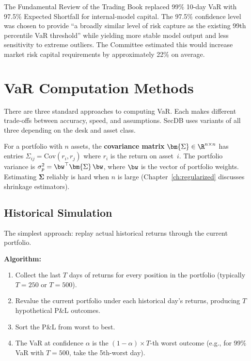 \begin{keyresult}
The Fundamental Review of the Trading Book replaced 99\% 10-day VaR
with 97.5\% Expected Shortfall for internal-model capital.  The 97.5\%
confidence level was chosen to provide ``a broadly similar level of risk
capture as the existing 99th percentile VaR threshold'' while yielding
more stable model output and less sensitivity to extreme outliers.
The Committee estimated this would increase market risk capital
requirements by approximately 22\% on average.
\end{keyresult}


\section{VaR Computation Methods}
\label{sec:var-methods}

There are three standard approaches to computing VaR.  Each makes different
trade-offs between accuracy, speed, and assumptions.  SecDB uses variants
of all three depending on the desk and asset class.

\begin{prereq}
For a portfolio with $n$ assets, the \textbf{covariance matrix}
$\bm{\Sigma} \in \R^{n \times n}$ has entries
$\Sigma_{ij} = \text{Cov}(r_i, r_j)$ where $r_i$ is the return on
asset~$i$.  The portfolio variance is
$\sigma_p^2 = \bw^\top \bm{\Sigma}\, \bw$,
where $\bw$ is the vector of portfolio weights.
Estimating $\bm{\Sigma}$ reliably is hard when $n$ is large
(Chapter~\ref{ch:regularized} discusses shrinkage estimators).
\end{prereq}

\subsection{Historical Simulation}
\label{subsec:hist-sim}

The simplest approach: replay actual historical returns through the current
portfolio.

\textbf{Algorithm:}
\begin{enumerate}[nosep]
  \item Collect the last $T$ days of returns for every position in the
        portfolio (typically $T=250$ or $T=500$).
  \item Revalue the current portfolio under each historical day's returns,
        producing $T$ hypothetical P\&L outcomes.
  \item Sort the P\&L from worst to best.
  \item The VaR at confidence $\alpha$ is the $(1-\alpha)\times T$-th
        worst outcome (e.g., for 99\% VaR with $T=500$, take the 5th-worst
        day).
\end{enumerate}

